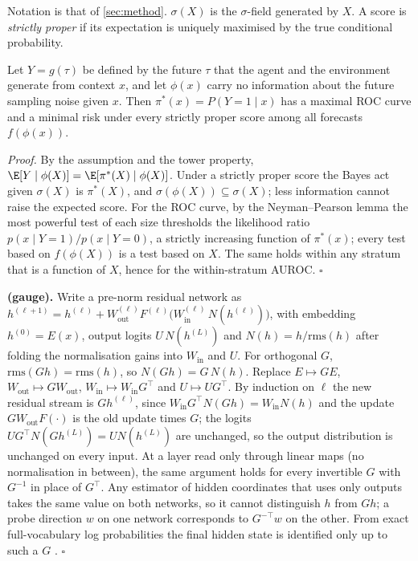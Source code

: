 Notation is that of \cref{sec:method}. $\sigma(X)$ is the $\sigma$-field generated by $X$. A score is \emph{strictly proper}
if its expectation is uniquely maximised by the true conditional probability.

\begin{proposition}\label{prop:behaviour}
Let $Y=g(\tau)$ be defined by the future $\tau$ that the agent and the environment generate from context $x$, and let
$\phi(x)$ carry no information about the future sampling noise given $x$. Then $\pi^*(x)=P(Y=1\mid x)$ has a maximal ROC curve
and a minimal risk under every strictly proper score among all forecasts $f(\phi(x))$.
\end{proposition}
\emph{Proof.} By the assumption and the tower property, $\E[Y\mid\phi(X)]=\E[\pi^*(X)\mid\phi(X)]$. Under a strictly proper
score the Bayes act given $\sigma(X)$ is $\pi^*(X)$, and $\sigma(\phi(X))\subseteq\sigma(X)$; less information cannot raise the
expected score. For the ROC curve, by the Neyman--Pearson lemma the most powerful test of each size thresholds the likelihood
ratio $p(x\mid Y{=}1)/p(x\mid Y{=}0)$, a strictly increasing function of $\pi^*(x)$; every test based on $f(\phi(X))$ is a test
based on $X$. The same holds within any stratum that is a function of $X$, hence for the within-stratum AUROC. $\square$

\textbf{ (gauge).} Write a pre-norm residual network as $h^{(\ell+1)}=h^{(\ell)}+W^{(\ell)}_{\mathrm{out}}
F^{(\ell)}\big(W^{(\ell)}_{\mathrm{in}}\,N(h^{(\ell)})\big)$, with embedding $h^{(0)}=E(x)$, output logits
$U\,N(h^{(L)})$ and $N(h)=h/\mathrm{rms}(h)$ after folding the normalisation gains into $W_{\mathrm{in}}$ and $U$. For orthogonal
$G$, $\mathrm{rms}(Gh)=\mathrm{rms}(h)$, so $N(Gh)=G\,N(h)$. Replace $E\mapsto GE$, $W_{\mathrm{out}}\mapsto GW_{\mathrm{out}}$,
$W_{\mathrm{in}}\mapsto W_{\mathrm{in}}G^{\top}$ and $U\mapsto UG^{\top}$. By induction on $\ell$ the new residual stream is
$Gh^{(\ell)}$, since $W_{\mathrm{in}}G^\top N(Gh)=W_{\mathrm{in}}N(h)$ and the update $GW_{\mathrm{out}}F(\cdot)$ is the old
update times $G$; the logits $UG^\top N(Gh^{(L)})=U N(h^{(L)})$ are unchanged, so the output distribution is unchanged on every
input. At a layer read only through linear maps (no normalisation in between), the same argument holds for every invertible
$G$ with $G^{-1}$ in place of $G^\top$. Any estimator of hidden coordinates that uses only outputs takes the same value on both
networks, so it cannot distinguish $h$ from $Gh$; a probe direction $w$ on one network corresponds to $G^{-\top}w$ on the other.
From exact full-vocabulary log probabilities the final hidden state is identified only up to such a $G$ \citep{carlini2024stealing}. $\square$

